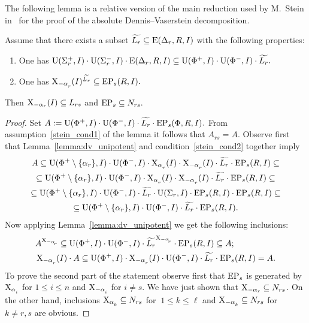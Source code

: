 The following lemma is a relative version of the main reduction used by M.~Stein in~\cite{St78} for the proof of the absolute Dennis--Vaserstein decomposition.
\begin{lemma}\label{lemma:Stein_reduction}
Assume that there exists a subset $\widetilde{L_r} \subseteq \operatorname{E}(\Delta_r, R, I)$ with the following properties:
\begin{enumerate}[label=(\alph*)] 
 \item\label{stein_cond1} One has $\operatorname{U}(\Sigma^+_r, I)\cdot \operatorname{U}(\Sigma^-_r, I) \cdot \operatorname{E}(\Delta_r, R, I) \subseteq \operatorname{U}(\Phi^+, I)\cdot \operatorname{U}(\Phi^-, I) \cdot \widetilde{L_r}.$
 \item\label{stein_cond2} One has $\X_{-\alpha\ssub{r}}(I)^{\widetilde{L_r}} \subseteq \EP_s(R, I).$
\end{enumerate}
Then $\operatorname{X}_{-\alpha_r}(I) \subseteq L_{rs}$ and $\operatorname{EP}_s \subseteq N_{rs}.$
\end{lemma}
\begin{proof} Set $A:=\operatorname{U}(\Phi^+, I)\cdot \operatorname{U}(\Phi^-, I) \cdot \widetilde{L_r} \cdot \operatorname{EP}_s(\Phi, R, I).$
From assumption~\ref{stein_cond1} of the lemma it follows that $A_{rs}=A$.
Observe first that Lemma~\ref{lemma:dv_unipotent} and condition~\ref{stein_cond2} together imply
\begin{multline*}
A \subseteq \U(\Phi^+\setminus \{\alpha_r\}, I) \cdot \U(\Phi^-, I) \cdot \X_{\alpha\ssub{r}}(I) \cdot \X_{-\alpha\ssub{r}}(I) \cdot \widetilde{L_r} \cdot \EP_s(R, I) \subseteq \\ 
\subseteq \U(\Phi^+\setminus\{\alpha_r\}, I) \cdot \U(\Phi^-, I) \cdot \X_{\alpha\ssub{r}}(I) \cdot \X_{-\alpha\ssub{r}}(I) \cdot \widetilde{L_r} \cdot \EP_s(R, I) \subseteq \\
\subseteq \U(\Phi^+\setminus\{\alpha_r\}, I) \cdot \U(\Phi^-, I) \cdot \widetilde{L_r} \cdot \U(\Sigma_r, I) \cdot \EP_s(R, I)  \cdot \EP_s(R, I) \subseteq \\
\subseteq \U(\Phi^+\setminus\{\alpha_r\}, I) \cdot \U(\Phi^-, I) \cdot \widetilde{L_r} \cdot \EP_s(R, I).
\end{multline*}
Now applying Lemma~\ref{lemma:dv_unipotent} we get the following inclusions:
\begin{align*}
& A^{\X_{-\alpha\ssub{r}}} \subseteq \U(\Phi^+, I) \cdot \U(\Phi^-, I) \cdot \widetilde{L_r} ^{\X_{-\alpha\ssub{r}}} \cdot \EP_s(R, I) \subseteq A; \\
& \X_{-\alpha\ssub{r}}(I) \cdot A \subseteq \U(\Phi^+, I) \cdot \X_{-\alpha\ssub{r}}(I) \cdot \U(\Phi^-, I) \cdot \widetilde{L_r} \cdot \EP_s(R, I) = A.
\end{align*}
To prove the second part of the statement observe first that $\operatorname{EP}_s$ is generated by $\X_{\alpha\ssub{i}}$ for $1\leqslant i\leqslant n$ and $\X_{-\alpha\ssub{i}}$ for $i\neq s$.
We have just shown that $\operatorname{X}_{-\alpha_r}\subseteq N_{rs}$.
On the other hand, inclusions $\X_{\alpha\ssub{k}} \subseteq N_{rs}$ for $\ 1\leqslant k\leqslant \ell$ and $\X_{-\alpha\ssub{k}} \subseteq N_{rs}$ for $k\neq r,s$ are obvious.
\end{proof}

